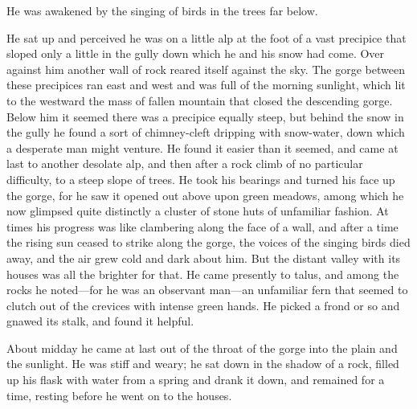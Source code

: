 \documentclass[submission]{sffms}
\begin{document}
He was awakened by the singing of birds in the trees far below.

He sat up and perceived he was on a little alp at the foot of a vast
precipice that sloped only a little in the gully down which he and his
snow had come. Over against him another wall of rock reared itself
against the sky. The gorge between these precipices ran east and west
and was full of the morning sunlight, which lit to the westward the
mass of fallen mountain that closed the descending gorge. Below him it
seemed there was a precipice equally steep, but behind the snow in the
gully he found a sort of chimney-cleft dripping with snow-water, down
which a desperate man might venture. He found it easier than it
seemed, and came at last to another desolate alp, and then after a
rock climb of no particular difficulty, to a steep slope of trees. He
took his bearings and turned his face up the gorge, for he saw it
opened out above upon green meadows, among which he now glimpsed quite
distinctly a cluster of stone huts of unfamiliar fashion. At times his
progress was like clambering along the face of a wall, and after a
time the rising sun ceased to strike along the gorge, the voices of
the singing birds died away, and the air grew cold and dark about him.
But the distant valley with its houses was all the brighter for
that. He came presently to talus, and among the rocks he noted---for he
was an observant man---an unfamiliar fern that seemed to clutch out of
the crevices with intense green hands. He picked a frond or so and
gnawed its stalk, and found it helpful.

About midday he came at last out of the throat of the gorge into the
plain and the sunlight. He was stiff and weary; he sat down in the
shadow of a rock, filled up his flask with water from a spring and
drank it down, and remained for a time, resting before he went on to
the houses.
\end{document}
